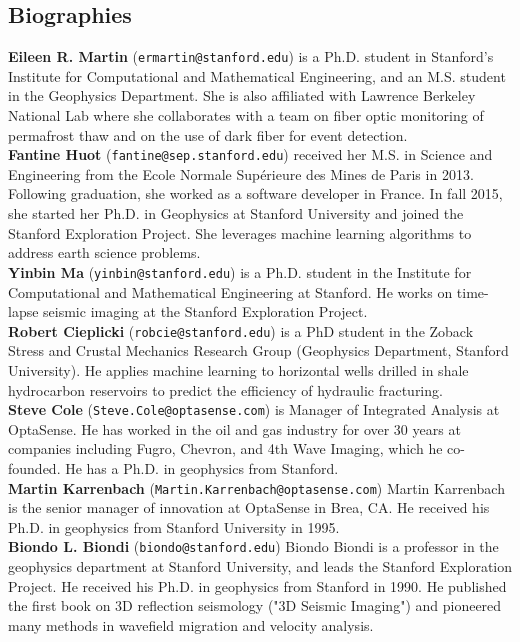 \documentclass[11pt]{article}
\begin{document}
\vspace{-0.9cm}
\subsection*{Biographies}
\small
\vspace{-0.2cm}
\textbf{Eileen R. Martin} (\texttt{ermartin@stanford.edu}) is a Ph.D. student in Stanford's Institute for Computational and Mathematical Engineering, and an M.S. student in the Geophysics Department. She is also affiliated with Lawrence Berkeley National Lab where she collaborates with a team on fiber optic monitoring of permafrost thaw and on the use of dark fiber for event detection.
\\
\textbf{Fantine Huot} (\texttt{fantine@sep.stanford.edu}) received her M.S. in Science and Engineering from the Ecole Normale Sup\'erieure des Mines de Paris in 2013. Following graduation, she worked as a software developer in France. In fall 2015, she started her Ph.D. in Geophysics at Stanford University and joined the Stanford Exploration Project. She leverages machine learning algorithms to address earth science problems.
\\
\textbf{Yinbin Ma} (\texttt{yinbin@stanford.edu}) is a Ph.D. student in the Institute for Computational and Mathematical Engineering at Stanford. He works on time-lapse seismic imaging at the Stanford Exploration Project.
\\
\textbf{Robert Cieplicki} (\texttt{robcie@stanford.edu}) is a PhD student in the Zoback Stress and Crustal Mechanics Research Group (Geophysics Department, Stanford University). He applies machine learning to horizontal wells drilled in shale hydrocarbon reservoirs to predict the efficiency of hydraulic fracturing.
\\
\textbf{Steve Cole} (\texttt{Steve.Cole@optasense.com}) is Manager of Integrated Analysis at OptaSense. He has worked in the oil and gas industry for over 30 years at companies including Fugro, Chevron, and 4th Wave Imaging, which he co-founded. He has a Ph.D. in geophysics from Stanford.
\\
\textbf{Martin Karrenbach} (\texttt{Martin.Karrenbach@optasense.com}) Martin Karrenbach is the senior manager of innovation at OptaSense in Brea, CA. He received his Ph.D. in geophysics from Stanford University in 1995. 
\\
\textbf{Biondo L. Biondi} (\texttt{biondo@stanford.edu}) Biondo Biondi is a professor in the geophysics department at Stanford University, and leads the Stanford Exploration Project. He received his Ph.D. in geophysics from Stanford in 1990. He published the first book on 3D reflection seismology ("3D Seismic Imaging") and pioneered many methods in wavefield migration and velocity analysis.
\end{document}
